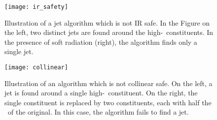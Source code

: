 %
%
%
\begin{figure}[tbp]

\begin{center}
\texttt{[image: ir\_safety]}
\end{center}
\caption[IR safety in jet finding algorithms]{Illustration of a jet algorithm which is not IR safe. In the Figure on the left, two distinct jets are found around the high-\pt~constituents. In the presence of soft radiation (right), the algorithm finds only a single jet.}
\label{fig_irsafety}
\end{figure}

\begin{figure}[tbp]
\begin{center}
\texttt{[image: collinear]}
\end{center}
\caption[Collinear safety in jet finding algorithms]{Illustration of an algorithm which is not collinear safe. On the left, a jet is found around a single high-\pt~constituent. On the right, the single constituent is replaced by two constituents, each with half the \pt~of the original. In this case, the algorithm fails to find a jet.}
\label{collinear_fig}
\end{figure}




